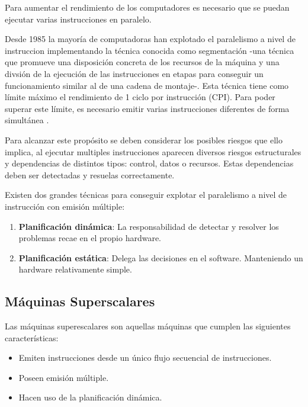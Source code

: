 Para aumentar el rendimiento de los computadores es necesario 
que se puedan ejecutar varias instrucciones en paralelo.

\bigskip
Desde 1985 la mayoría de computadoras han explotado el paralelismo
a nivel de instruccion implementando la técnica conocida como 
segmentación -una técnica que promueve una disposición concreta 
de los recursos de la máquina y una divsión de la ejecución de 
las instrucciones en etapas para conseguir un funcionamiento 
similar al de una cadena de montaje-. Esta técnica tiene como
límite máximo  el rendimiento de 1 ciclo por instrucción (CPI). 
Para poder superar este límite, es necesario emitir varias 
instrucciones diferentes de forma simultánea \cite{Hennessy:2011}.

\bigskip
Para alcanzar este propósito se deben considerar los posibles
riesgos que ello implica, al ejecutar multiples instrucciones
aparecen diversos riesgos estructurales y dependencias de 
distintos tipos: control, datos o recursos. Estas dependencias
 deben ser detectadas y resuelas correctamente.

\bigskip
Existen dos grandes técnicas para conseguir explotar el 
paralelismo a nivel de instrucción con emisión múltiple:

\begin{enumerate}

\item \textbf{Planificación dinámica}: La responsabilidad de
detectar y resolver los problemas recae en el propio hardware.

\item \textbf{Planificación estática}: Delega las decisiones en
 el software. Manteniendo un hardware relativamente simple.

\end{enumerate}

\subsection{Máquinas Superscalares}

Las máquinas superescalares son aquellas máquinas que cumplen 
las siguientes características:

\begin{itemize}

\item Emiten instrucciones desde un único flujo secuencial de 
instrucciones.

\item Poseen emisión múltiple.

\item Hacen uso de la planificación dinámica.

\end{itemize}

